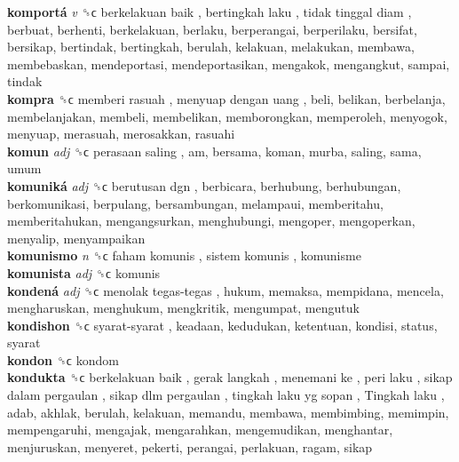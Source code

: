 \textbf{komportá} \emph{v}  ␝ϲ   berkelakuan baik ,  bertingkah laku ,  tidak tinggal diam , berbuat, berhenti, berkelakuan, berlaku, berperangai, berperilaku, bersifat, bersikap, bertindak, bertingkah, berulah, kelakuan, melakukan, membawa, membebaskan, mendeportasi, mendeportasikan, mengakok, mengangkut, sampai, tindak  \\
\textbf{kompra} ␝ϲ   memberi rasuah ,  menyuap dengan uang , beli, belikan, berbelanja, membelanjakan, membeli, membelikan, memborongkan, memperoleh, menyogok, menyuap, merasuah, merosakkan, rasuahi  \\
\textbf{komun} \emph{adj}  ␝ϲ   perasaan saling , am, bersama, koman, murba, saling, sama, umum  \\
\textbf{komuniká} \emph{adj}  ␝ϲ   berutusan dgn , berbicara, berhubung, berhubungan, berkomunikasi, berpulang, bersambungan, melampaui, memberitahu, memberitahukan, mengangsurkan, menghubungi, mengoper, mengoperkan, menyalip, menyampaikan  \\
\textbf{komunismo} \emph{n}  ␝ϲ   faham komunis ,  sistem komunis , komunisme  \\
\textbf{komunista} \emph{adj}  ␝ϲ  komunis  \\
\textbf{kondená} \emph{adj}  ␝ϲ   menolak tegas-tegas , hukum, memaksa, mempidana, mencela, mengharuskan, menghukum, mengkritik, mengumpat, mengutuk  \\
\textbf{kondishon} ␝ϲ   syarat-syarat , keadaan, kedudukan, ketentuan, kondisi, status, syarat  \\
\textbf{kondon} ␝ϲ  kondom  \\
\textbf{kondukta} ␝ϲ   berkelakuan baik ,  gerak langkah ,  menemani ke ,  peri laku ,  sikap dalam pergaulan ,  sikap dlm pergaulan ,  tingkah laku yg sopan ,  Tingkah laku , adab, akhlak, berulah, kelakuan, memandu, membawa, membimbing, memimpin, mempengaruhi, mengajak, mengarahkan, mengemudikan, menghantar, menjuruskan, menyeret, pekerti, perangai, perlakuan, ragam, sikap  \\
